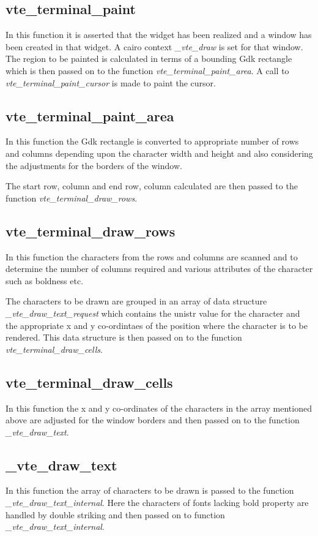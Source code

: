 \subsection{vte\_terminal\_paint}
In this function it is asserted that the widget has been realized and a window has been created in that widget. A cairo context \textit{\_vte\_draw} is set for that window. The region to be painted is calculated in terms of a bounding Gdk rectangle which is then passed on to the function \textit{vte\_terminal\_paint\_area}. A call to \textit{vte\_terminal\_paint\_cursor} is made to paint the cursor.

\subsection{vte\_terminal\_paint\_area}
In this function the Gdk rectangle is converted to appropriate number of rows and columns depending upon the character width and height and also considering the adjustments for the borders of the window.

The start row, column and end row, column calculated are then passed to the function \textit{vte\_terminal\_draw\_rows}.

\subsection{vte\_terminal\_draw\_rows}
In this function the characters from the rows and columns are scanned and to determine the  number of columns required and various attributes of the character such as boldness etc. 

The characters to be drawn are grouped in an array of data structure \\\textit{\_vte\_draw\_text\_request} which contains the unistr value for the character and the appropriate x and y co-ordintaes of the position where the character is to be rendered. This data structure is then passed on to the function  \textit{vte\_terminal\_draw\_cells}.

\subsection{vte\_terminal\_draw\_cells}
In this function the x and y co-ordinates of the characters in the array mentioned above are adjusted for the window borders and then passed on to the function \textit{\_vte\_draw\_text}.


\subsection{\_vte\_draw\_text}
In this function the array of characters to be drawn is passed to the function \\\textit{\_vte\_draw\_text\_internal}. Here the characters of fonts lacking bold property are handled by double striking and then passed on to function \textit{\_vte\_draw\_text\_internal}.

